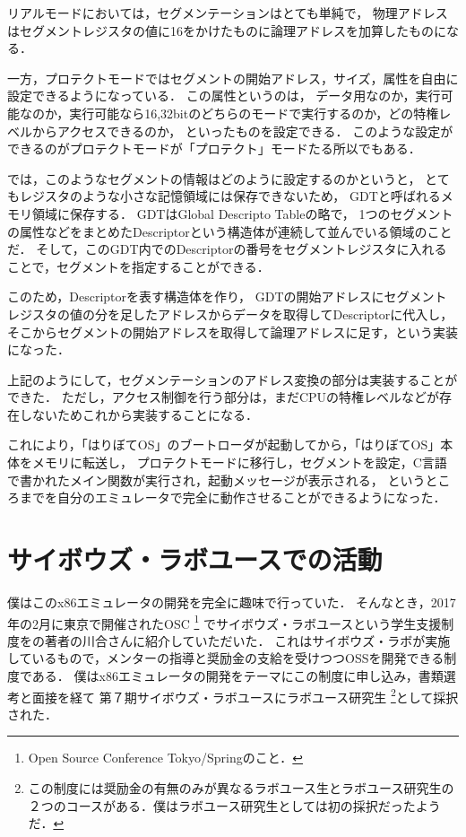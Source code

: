 \documentclass[10pt,a4j]{jsarticle}
\begin{document}
リアルモードにおいては，セグメンテーションはとても単純で，
物理アドレスはセグメントレジスタの値に16をかけたものに論理アドレスを加算したものになる．

一方，プロテクトモードではセグメントの開始アドレス，サイズ，属性を自由に設定できるようになっている．
この属性というのは，
データ用なのか，実行可能なのか，実行可能なら16,32bitのどちらのモードで実行するのか，どの特権レベルからアクセスできるのか，
といったものを設定できる．
このような設定ができるのがプロテクトモードが「プロテクト」モードたる所以でもある．

では，このようなセグメントの情報はどのように設定するのかというと，
とてもレジスタのような小さな記憶領域には保存できないため，
GDTと呼ばれるメモリ領域に保存する．
GDTはGlobal Descripto Tableの略で，
1つのセグメントの属性などをまとめたDescriptorという構造体が連続して並んでいる領域のことだ．
そして，このGDT内でのDescriptorの番号をセグメントレジスタに入れることで，セグメントを指定することができる．

このため，Descriptorを表す構造体を作り，
GDTの開始アドレスにセグメントレジスタの値の分を足したアドレスからデータを取得してDescriptorに代入し，
そこからセグメントの開始アドレスを取得して論理アドレスに足す，という実装になった．

上記のようにして，セグメンテーションのアドレス変換の部分は実装することができた．
ただし，アクセス制御を行う部分は，まだCPUの特権レベルなどが存在しないためこれから実装することになる．

これにより，「はりぼてOS」のブートローダが起動してから，「はりぼてOS」本体をメモリに転送し，
プロテクトモードに移行し，セグメントを設定，C言語で書かれたメイン関数が実行され，起動メッセージが表示される，
というところまでを自分のエミュレータで完全に動作させることができるようになった．


\section{サイボウズ・ラボユースでの活動}

僕はこのx86エミュレータの開発を完全に趣味で行っていた．
そんなとき，2017年の2月に東京で開催されたOSC
\footnote{Open Source Conference Tokyo/Springのこと．}
でサイボウズ・ラボユースという学生支援制度を\cite{30days-osdev}の著者の川合さんに紹介していただいた．
これはサイボウズ・ラボが実施しているもので，メンターの指導と奨励金の支給を受けつつOSSを開発できる制度である．
僕はx86エミュレータの開発をテーマにこの制度に申し込み，書類選考と面接を経て
第７期サイボウズ・ラボユースにラボユース研究生
\footnote{この制度には奨励金の有無のみが異なるラボユース生とラボユース研究生の２つのコースがある．僕はラボユース研究生としては初の採択だったようだ．}として採択された．
\end{document}
